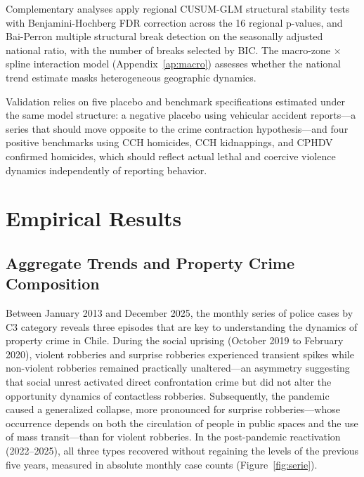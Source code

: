 \documentclass[pdflatex,sn-basic]{sn-jnl}
\begin{document}
Complementary analyses apply regional CUSUM-GLM structural stability tests \citep{zeileis2002} with Benjamini-Hochberg FDR correction across the 16 regional p-values, and Bai-Perron multiple structural break detection \citep{bai1998} on the seasonally adjusted national ratio, with the number of breaks selected by BIC. The macro-zone $\times$ spline interaction model (Appendix~\ref{ap:macro}) assesses whether the national trend estimate masks heterogeneous geographic dynamics.

Validation relies on five placebo and benchmark specifications estimated under the same model structure: a negative placebo using vehicular accident reports---a series that should move opposite to the crime contraction hypothesis---and four positive benchmarks using CCH homicides, CCH kidnappings, and CPHDV confirmed homicides, which should reflect actual lethal and coercive violence dynamics independently of reporting behavior.
\section{Empirical Results}
\label{sec:resultados}

\subsection{Aggregate Trends and Property Crime Composition}
\label{sub:descriptivo}

Between January 2013 and December 2025, the monthly series of police cases by C3 category reveals three episodes that are key to understanding the dynamics of property crime in Chile. During the social uprising (October 2019 to February 2020), violent robberies and surprise robberies experienced transient spikes while non-violent robberies remained practically unaltered---an asymmetry suggesting that social unrest activated direct confrontation crime but did not alter the opportunity dynamics of contactless robberies. Subsequently, the pandemic caused a generalized collapse, more pronounced for surprise robberies---whose occurrence depends on both the circulation of people in public spaces and the use of mass transit---than for violent robberies. In the post-pandemic reactivation (2022--2025), all three types recovered without regaining the levels of the previous five years, measured in absolute monthly case counts (Figure~\ref{fig:serie}).
\end{document}

